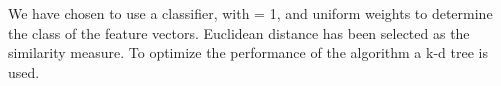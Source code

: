 We have chosen to use a \Knn classifier, with \knnk = 1, and uniform weights to determine the class of the feature vectors. Euclidean distance has been selected as the similarity measure. To optimize the performance of the \knn algorithm a k-d tree is used.